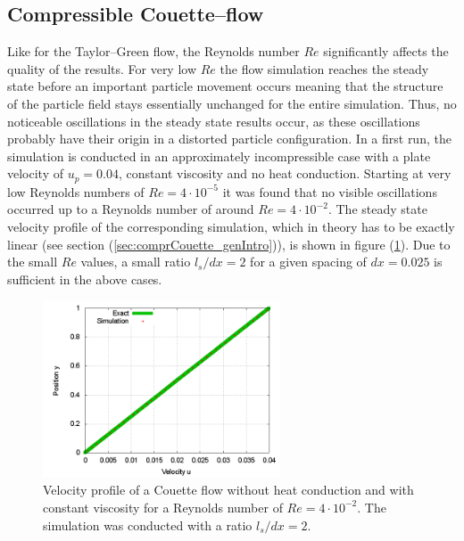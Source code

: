 \documentclass[11pt,a4paper,twoside]{report}
\begin{document}

\subsection{Compressible Couette--flow}

Like for the Taylor--Green flow, the Reynolds number $Re$ significantly affects the quality of the results. For very low $Re$ the flow simulation reaches the steady state before an important particle movement occurs meaning that the structure of the particle field stays essentially unchanged for the entire simulation. Thus, no noticeable oscillations in the steady state results occur, as these oscillations probably have their origin in a distorted particle configuration. 
In a first run, the simulation is conducted in an approximately incompressible case with a plate velocity of $u_p=0.04$, constant viscosity and no heat conduction. Starting at very low Reynolds numbers of $Re=4\cdot10^{-5}$ it was found that no visible oscillations occurred up to a Reynolds number of around $Re=4\cdot10^{-2}$. The steady state velocity profile of the corresponding simulation, which in theory has to be exactly linear (see section (\ref{sec:comprCouette_genIntro})), is shown in figure (\ref{fig:CompCouette_U_const_eta}). Due to the small $Re$ values, a small ratio $l_s/dx=2$ for a given spacing of $dx=0.025$ is sufficient in the above cases. 


\begin{figure}
 \centering
\label{fig:CompCouette_U_const_eta}
\includegraphics[width=7cm]{Graphics/results/CompressibleCouette/N2x40_supLen_dx2_eta1/U_profiles000001000019}
\caption[steady State velocity incompressible Couette]{Velocity profile of a Couette flow without heat conduction and with constant viscosity for a Reynolds number of $Re=4\cdot10^{-2}$. The simulation was conducted with a ratio $l_s/dx=2$.}
\end{figure}
\end{document}
